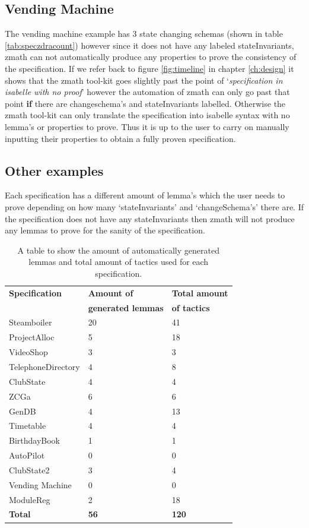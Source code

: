 \subsection{Vending Machine}

The vending machine example has 3 state changing schemas (shown in table
\ref{tab:speczdracount}) however since it does not have any labeled
stateInvariants, \gls{zmath} can not automatically produce any properties to
prove the consistency of the specification. If we refer back to figure
\ref{fig:timeline} in chapter \ref{ch:design} it shows that the \gls{zmath}
tool-kit goes slightly past the point of `\emph{specification in isabelle with no
proof}' however the automation of \gls{zmath} can only go past that point
\textbf{if} there are changeschema's and stateInvariants labelled. Otherwise the
\gls{zmath} tool-kit can only translate the specification into isabelle syntax
with no lemma's or properties to prove. Thus it is up to the user to carry on
manually inputting their properties to obtain a fully proven specification.

\subsection{Other examples}

Each specification has a different amount of lemma's which the user needs to
prove depending on how many `stateInvariants' and `changeSchema's' there are. If
the specification does not have any stateInvariants then \gls{zmath} will not
produce any lemmas to prove for the sanity of the specification.

\begin{table}[H]
\begin{tabular}{|l | l | l |}
\hline
\textbf{Specification} & \textbf{Amount of} & \textbf{Total amount} \\
& \textbf{generated lemmas} & \textbf{of tactics} \\
\hline
Steamboiler & 20 & 41 \\
ProjectAlloc & 5 & 18 \\
VideoShop & 3 & 3 \\
TelephoneDirectory & 4 & 8 \\
ClubState & 4 & 4 \\
ZCGa & 6 & 6 \\
GenDB & 4 & 13 \\
Timetable & 4 & 4 \\
BirthdayBook & 1 & 1\\
AutoPilot & 0 & 0 \\
ClubState2 & 3 & 4 \\
Vending Machine & 0 & 0 \\
ModuleReg & 2 & 18 \\
\hline
\textbf{Total} & \textbf{56} & \textbf{120}\\
\hline
\end{tabular}
\caption{A table to show the amount of automatically generated lemmas and total amount of tactics used for each specification. \label{tab:lemmatact}}
\end{table}

